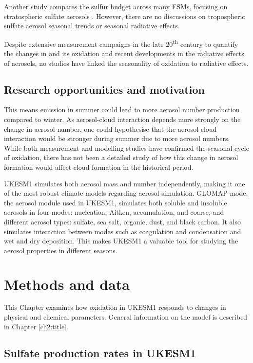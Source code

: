 Another study compares the sulfur budget across many ESMs, focusing on stratospheric sulfate aerosols \citep{brodowskyAnalysisGlobalAtmospheric2024}. However, there are no discussions on tropospheric sulfate aerosol seasonal trends or seasonal radiative effects.

Despite extensive measurement campaigns in the late 20\textsuperscript{th} century to quantify the changes in  and its oxidation and recent developments in the radiative effects of aerosols, no studies have linked the seasonality of oxidation to radiative effects.


\subsection{Research opportunities and motivation}

This means  emission in summer could lead to more aerosol number production compared to winter. As aerosol-cloud interaction depends more strongly on the change in aerosol number, one could hypothesise that the aerosol-cloud interaction would be stronger during summer due to more aerosol numbers. While both measurement and modelling studies have confirmed the seasonal cycle of  oxidation, there has not been a detailed study of how this change in aerosol formation would affect cloud formation in the historical period. 

UKESM1 simulates both aerosol mass and number independently, making it one of the most robust climate models regarding aerosol simulation. GLOMAP-mode, the aerosol module used in UKESM1, simulates both soluble and insoluble aerosols in four modes: nucleation, Aitken, accumulation, and coarse, and different aerosol types: sulfate, sea salt, organic, dust, and black carbon. It also simulates interaction between modes such as coagulation and condensation and wet and dry deposition. This makes UKESM1 a valuable tool for studying the aerosol properties in different seasons.


\section{Methods and data}

This Chapter examines how  oxidation in UKESM1 responds to changes in physical and chemical parameters. General information on the model is described in Chapter \ref{ch2:title}.

\subsection{Sulfate production rates in UKESM1}
\label{ch4:sec:so4-prod-rate}

